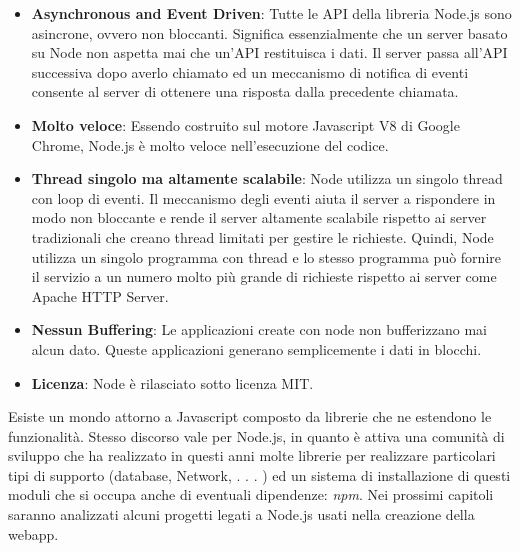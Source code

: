 \begin{itemize}
\item \textbf{Asynchronous and Event Driven}: Tutte le API della libreria Node.js sono asincrone, ovvero non bloccanti. Significa essenzialmente che un server basato su Node non aspetta mai che un'API restituisca i dati. Il server passa all'API successiva dopo averlo chiamato ed un meccanismo di notifica di eventi consente al server di ottenere una risposta dalla precedente chiamata.
\item \textbf{Molto veloce}: Essendo costruito sul motore Javascript V8 di Google Chrome, Node.js è molto veloce nell'esecuzione del codice.
\item \textbf{Thread singolo ma altamente scalabile}: Node utilizza un singolo thread con loop di eventi. Il meccanismo degli eventi aiuta il server a rispondere in modo non bloccante e rende il server altamente scalabile rispetto ai server tradizionali che creano thread limitati per gestire le richieste. Quindi, Node utilizza un singolo programma con thread e lo stesso programma può fornire il servizio a un numero molto più grande di richieste rispetto ai server come Apache HTTP Server.
\item \textbf{Nessun Buffering}: Le applicazioni create con node non bufferizzano mai alcun dato. Queste applicazioni generano semplicemente i dati in blocchi.
\item \textbf{Licenza}: Node è rilasciato sotto licenza MIT. 
\end{itemize}
Esiste un mondo attorno a Javascript composto da librerie che ne estendono le funzionalità. Stesso discorso vale per Node.js, in quanto è attiva una comunità di sviluppo che ha realizzato in questi anni molte librerie per realizzare particolari tipi di supporto (database, Network, . . . ) ed un sistema di installazione di questi moduli che si occupa anche di eventuali dipendenze: \textit{npm}. Nei prossimi capitoli saranno analizzati alcuni progetti legati a Node.js usati nella creazione della webapp.

